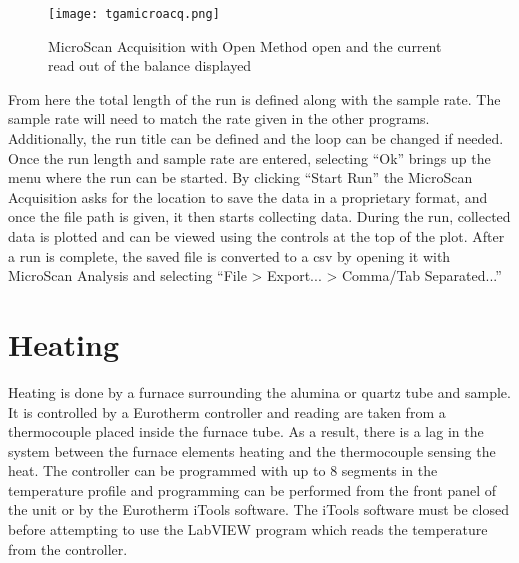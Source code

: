         \begin{figure}
            \begin{center}
            \texttt{[image: tgamicroacq.png]}
            \end{center}
            \caption{MicroScan Acquisition with Open Method open and the current read out of the balance displayed}
            \label{fig:tgamicroaq}
        \end{figure}

        From here the total length of the run is defined along with the sample rate.
        The sample rate will need to match the rate given in the other programs.
        Additionally, the run title can be defined and the loop can be changed if needed.
        Once the run length and sample rate are entered, selecting ``Ok'' brings up the menu where the run can be started.
        By clicking ``Start Run'' the MicroScan Acquisition asks for the location to save the data in a proprietary format, and once the file path is given, it then starts collecting data.
        During the run, collected data is plotted and can be viewed using the controls at the top of the plot.
        After a run is complete, the saved file is converted to a \gls{csv} by opening it with MicroScan Analysis and selecting ``File \textgreater{} Export... \textgreater{} Comma/Tab Separated...''

\section{Heating}
    Heating is done by a furnace surrounding the alumina or quartz tube and sample.
    It is controlled by a Eurotherm controller and reading are taken from a thermocouple placed inside the furnace tube.
    As a result, there is a lag in the system between the furnace elements heating and the thermocouple sensing the heat.
    The controller can be programmed with up to 8 segments in the temperature profile and programming can be performed from the front panel of the unit or by the Eurotherm iTools software.
    The iTools software must be closed before attempting to use the LabVIEW program which reads the temperature from the controller.

